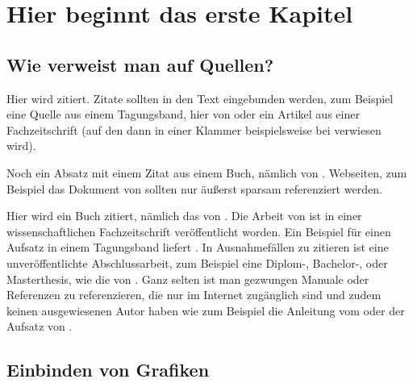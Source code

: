 \documentclass[12pt,a4paper%
              ,oneside     %
              ,titlepage
              ,DIV=13
              ,headinclude
              ,footinclude=false%
              ,cleardoublepage=empty%
              ,parskip=half,
              BCOR=0mm,
              ]{scrreprt}
\begin{document}
\selectlanguage{\thesisLanguage}

\setcounter{page}{1}

\THAtitlepage

\tableofcontents


\setcounter{page}{1}

\chapter{Hier beginnt das erste Kapitel}

\section{Wie verweist man auf Quellen?}

Hier wird \citet{Neumann:1977} zitiert. Zitate sollten in den Text eingebunden werden, zum Beispiel eine Quelle aus einem Tagungsband, hier von \citet{Bauer} oder ein Artikel aus einer Fachzeitschrift (auf den dann in einer Klammer beispielsweise bei \cite{Fox:2002} verwiesen wird). 

Noch ein Absatz mit einem Zitat aus einem Buch, nämlich von \citet{R:Chambers:1998}. Webseiten, zum Beispiel das Dokument von \citet{xmlComparingSchemata} sollten nur äußerst sparsam referenziert werden. 

Hier wird ein Buch zitiert, nämlich das von \citet{darwin}. Die Arbeit von \citet{meulman} ist in einer wissenschaftlichen Fachzeitschrift veröffentlicht worden. Ein Beispiel für einen Aufsatz in einem Tagungsband liefert \citet{banzhaf96effect}. In Ausnahmefällen zu zitieren ist eine unveröffentlichte Abschlussarbeit, zum Beispiel eine Diplom-, Bachelor-, oder Masterthesis, wie die von \citet{holzheuer}. Ganz selten ist man gezwungen Manuale oder Referenzen zu referenzieren, die nur im Internet zugänglich sind und zudem keinen ausgewiesenen Autor haben wie zum Beispiel die Anleitung vom \citet{hornik} oder der Aufsatz von \citet{xmlComparingSchemata}.

\section{Einbinden von Grafiken}
\end{document}
